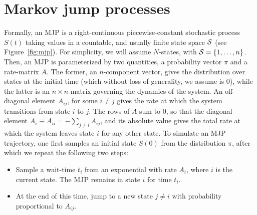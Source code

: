 \section{Markov jump processes}
Formally, an MJP is a right-continuous piecewise-constant stochastic
process $S(t)$ taking values in a countable, and usually finite state
space ${\mathcal S}$ (see Figure~\ref{fig:mjp}). For simplicity, we will assume 
$N$-states, with ${\mathcal S} = \{1,\ldots,n\}$. Then, an MJP is 
parameterized by two quantities, a probability vector $\pi$ and a 
rate-matrix $A$. The former, an $n$-component vector, gives the 
distribution over states at the 
initial time (which without loss of generality, we assume is 0), while 
the latter is an $n \times n$-matrix governing the dynamics of the system.
An off-diagonal element $A_{ij}$, for some $i \neq j$ gives the rate at 
which the system transitions from state $i$ to $j$. The rows of $A$ sum
to $0$, so that the diagonal element $A_i \equiv A_{ii} = -\sum_{j \neq i} A_{ij}$, 
and its absolute value gives
the total rate at which the system leaves state $i$ for any other state.
To simulate an MJP trajectory, one first samples an initial state $S(0)$ 
from the distribution $\pi$, after which we repeat the following two steps:
\begin{itemize}
  \item Sample a wait-time $t_i$ from an exponential with rate $A_i$, where
    $i$ is the current state. The MJP remains in state $i$ for time $t_i$.
  \item At the end of this time, jump to a new state $j \neq i$ with 
    probability proportional to $A_{ij}$.
\end{itemize}

